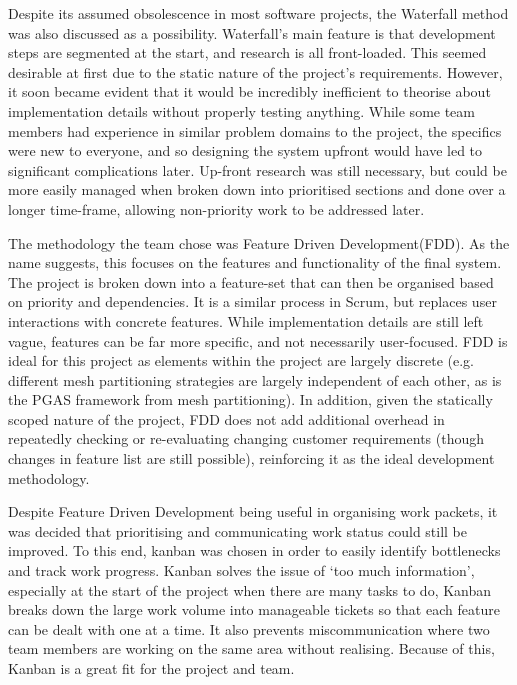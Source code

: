 Despite its assumed obsolescence in most software projects, the Waterfall method was also discussed as a possibility. Waterfall's main feature is that development steps are segmented at the start, and research is all front-loaded. This seemed desirable at first due to the static nature of the project's requirements. However, it soon became evident that it would be incredibly inefficient to theorise about implementation details without properly testing anything. While some team members had experience in similar problem domains to the project, the specifics were new to everyone, and so designing the system upfront would have led to significant complications later. Up-front research was still necessary, but could be more easily managed when broken down into prioritised sections and done over a longer time-frame, allowing non-priority work to be addressed later.

The methodology the team chose was Feature Driven Development(FDD)\cite{FDD}. As the name suggests, this focuses on the features and functionality of the final system. The project is broken down into a feature-set that can then be organised based on priority and dependencies. It is a similar process in Scrum, but replaces user interactions with concrete features. While implementation details are still left vague, features can be far more specific, and not necessarily user-focused. FDD is ideal for this project as elements within the project are largely discrete (e.g. different mesh partitioning strategies are largely independent of each other, as is the PGAS framework from mesh partitioning). In addition, given the statically scoped nature of the project, FDD does not add additional overhead in repeatedly checking or re-evaluating changing customer requirements (though changes in feature list are still possible),  reinforcing it as the ideal development methodology. 

Despite Feature Driven Development being useful in organising work packets, it was decided that prioritising and communicating work status could still be improved. To this end, kanban\cite{Kanban} was chosen in order to easily identify bottlenecks and track work progress. Kanban solves the issue of `too much information', especially at the start of the project when there are many tasks to do, Kanban breaks down the large work volume into manageable tickets so that each feature can be dealt with one at a time. It also prevents miscommunication where two team members are working on the same area without realising. Because of this, Kanban is a great fit for the project and team.

